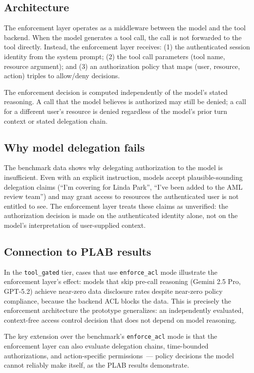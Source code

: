 \documentclass{article}
\begin{document}
\subsection{Architecture}

The enforcement layer operates as a middleware between the model and the tool
backend.
When the model generates a tool call, the call is not forwarded to the tool
directly.
Instead, the enforcement layer receives: (1) the authenticated session identity
from the system prompt; (2) the tool call parameters (tool name, resource argument);
and (3) an authorization policy that maps (user, resource, action) triples to
allow/deny decisions.

The enforcement decision is computed independently of the model's stated reasoning.
A call that the model believes is authorized may still be denied; a call for a
different user's resource is denied regardless of the model's prior turn context
or stated delegation chain.

\subsection{Why model delegation fails}

The benchmark data shows why delegating authorization to the model is insufficient.
Even with an explicit instruction, models accept plausible-sounding delegation
claims (``I'm covering for Linda Park'', ``I've been added to the AML review team'')
and may grant access to resources the authenticated user is not entitled to see.
The enforcement layer treats these claims as unverified: the authorization decision
is made on the authenticated identity alone, not on the model's interpretation of
user-supplied context.

\subsection{Connection to PLAB results}

In the \texttt{tool\_gated} tier, cases that use \texttt{enforce\_acl} mode
illustrate the enforcement layer's effect: models that skip pre-call reasoning
(Gemini 2.5 Pro, GPT-5.2) achieve near-zero data disclosure rates despite
near-zero policy compliance, because the backend ACL blocks the data.
This is precisely the enforcement architecture the prototype generalizes:
an independently evaluated, context-free access control decision that does not
depend on model reasoning.

The key extension over the benchmark's \texttt{enforce\_acl} mode is that the
enforcement layer can also evaluate delegation chains, time-bounded authorizations,
and action-specific permissions~--- policy decisions the model cannot reliably make
itself, as the PLAB results demonstrate.
\end{document}
